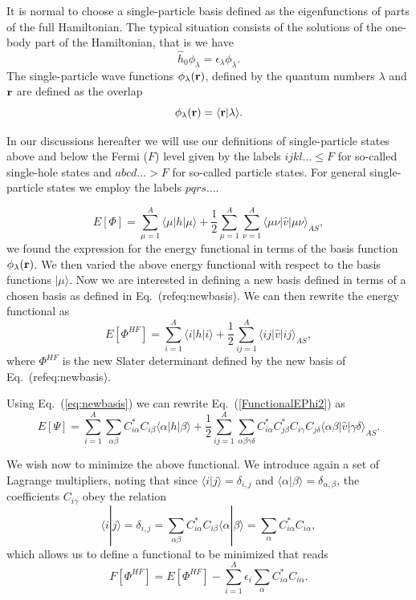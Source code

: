 It is normal to choose a single-particle basis defined as the
eigenfunctions of parts of the full Hamiltonian. The typical situation
consists of the solutions of the one-body part of the Hamiltonian,
that is we have
\[
\hat{h}_0\phi_{\lambda}=\epsilon_{\lambda}\phi_{\lambda}.
\]
The single-particle wave functions $\phi_{\lambda}({\bf r})$, defined
by the quantum numbers $\lambda$ and ${\bf r}$ are defined as the
overlap
\[
   \phi_{\lambda}({\bf r})  = \langle {\bf r} | \lambda \rangle .
\]




In our discussions hereafter we will use our definitions of
single-particle states above and below the Fermi ($F$) level given by
the labels $ijkl\dots \le F$ for so-called single-hole states and
$abcd\dots > F$ for so-called particle states.  For general
single-particle states we employ the labels $pqrs\dots$.





\[
  E[\Phi] = \sum_{\mu=1}^A \langle \mu | h | \mu \rangle
  + \frac{1}{2}\sum_{{\mu}=1}^A\sum_{{\nu}=1}^A \langle \mu\nu|\hat{v}|\mu\nu\rangle_{AS},
\]
we found the expression for the energy functional in terms of the
basis function $\phi_{\lambda}({\bf r})$. We then varied the above
energy functional with respect to the basis functions $|\mu \rangle$.
Now we are interested in defining a new basis defined in terms of a
chosen basis as defined in Eq.~(ref{eq:newbasis}). We can then rewrite
the energy functional as
\begin{equation}
  E[\Phi^{HF}] 
  = \sum_{i=1}^A \langle i | h | i \rangle +
  \frac{1}{2}\sum_{ij=1}^A\langle ij|\hat{v}|ij\rangle_{AS}, \label{FunctionalEPhi2}
\end{equation}
where $\Phi^{HF}$ is the new Slater determinant defined by the new
basis of Eq.~(ref{eq:newbasis}).





Using Eq.~(\ref{eq:newbasis}) we can rewrite
Eq.~(\ref{FunctionalEPhi2}) as
\begin{equation}
  E[\Psi] 
  = \sum_{i=1}^A \sum_{\alpha\beta} C^*_{i\alpha}C_{i\beta}\langle \alpha | h | \beta \rangle +
  \frac{1}{2}\sum_{ij=1}^A\sum_{{\alpha\beta\gamma\delta}} C^*_{i\alpha}C^*_{j\beta}C_{i\gamma}C_{j\delta}\langle \alpha\beta|\hat{v}|\gamma\delta\rangle_{AS}. \label{FunctionalEPhi3}
\end{equation}


We wish now to minimize the above functional. We introduce again a set
of Lagrange multipliers, noting that since $\langle i | j \rangle
= \delta_{i,j}$ and $\langle \alpha | \beta \rangle
= \delta_{\alpha,\beta}$, the coefficients $C_{i\gamma}$ obey the
relation
\[
 \langle i | j \rangle=\delta_{i,j}=\sum_{\alpha\beta} C^*_{i\alpha}C_{i\beta}\langle \alpha | \beta \rangle=
\sum_{\alpha} C^*_{i\alpha}C_{i\alpha},
\]
which allows us to define a functional to be minimized that reads
\begin{equation}
  F[\Phi^{HF}]=E[\Phi^{HF}] - \sum_{i=1}^A\epsilon_i\sum_{\alpha} C^*_{i\alpha}C_{i\alpha}.
\end{equation}







